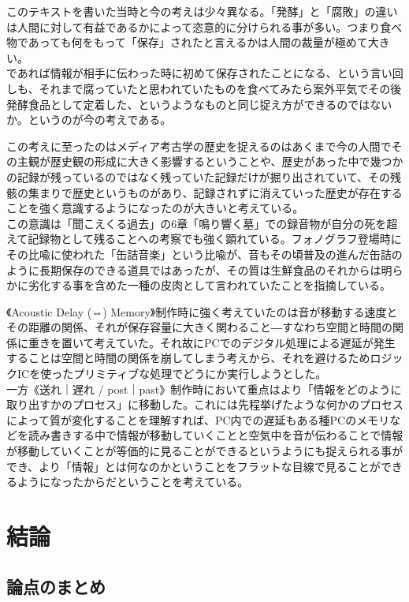 \documentclass[a4paper,report]{jsbook}
\begin{document}
このテキストを書いた当時と今の考えは少々異なる。「発酵」と「腐敗」の違いは人間に対して有益であるかによって恣意的に分けられる事が多い。つまり食べ物であっても何をもって「保存」されたと言えるかは人間の裁量が極めて大きい。\\
であれば情報が相手に伝わった時に初めて保存されたことになる、という言い回しも、それまで腐っていたと思われていたものを食べてみたら案外平気でその後発酵食品として定着した、というようなものと同じ捉え方ができるのではないか。というのが今の考えである。

この考えに至ったのはメディア考古学の歴史を捉えるのはあくまで今の人間でその主観が歴史観の形成に大きく影響するということや、歴史があった中で幾つかの記録が残っているのではなく残っていた記録だけが掘り出されていて、その残骸の集まりで歴史というものがあり、記録されずに消えていった歴史が存在することを強く意識するようになったのが大きいと考えている。\\
この意識は「聞こえくる過去」の6章「鳴り響く墓」での録音物が自分の死を超えて記録物として残ることへの考察でも強く顕れている。フォノグラフ登場時にその比喩に使われた「缶詰音楽」という比喩が、音もその頃普及の進んだ缶詰のように長期保存のできる道具ではあったが、その質は生鮮食品のそれからは明らかに劣化する事を含めた一種の皮肉として言われていたことを指摘している。

《Acoustic Delay (⇔)
Memory》制作時に強く考えていたのは音が移動する速度とその距離の関係、それが保存容量に大きく関わること―すなわち空間と時間の関係に重きを置いて考えていた。それ故にPCでのデジタル処理による遅延が発生することは空間と時間の関係を崩してしまう考えから、それを避けるためロジックICを使ったプリミティブな処理でどうにか実行しようとした。\\
一方《送れ｜遅れ /
post｜past》制作時において重点はより「情報をどのように取り出すかのプロセス」に移動した。これには先程挙げたような何かのプロセスによって質が変化することを理解すれば、PC内での遅延もある種PCのメモリなどを読み書きする中で情報が移動していくことと空気中を音が伝わることで情報が移動していくことが等価的に見ることができるというようにも捉えられる事ができ、より「情報」とは何なのかということをフラットな目線で見ることができるようになったからだということを考えている。

\chapter{結論}\label{ux7d50ux8ad6}

\section{論点のまとめ}\label{ux8ad6ux70b9ux306eux307eux3068ux3081}
\end{document}
